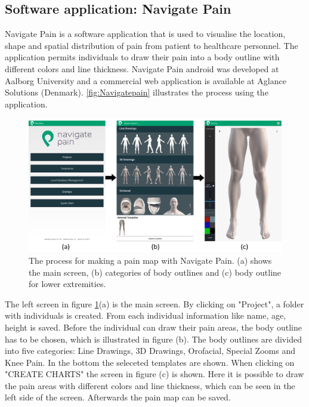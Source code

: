 \subsection{Software application: Navigate Pain} \label{sec:nav}
Navigate Pain is a software application that is used to visualise the location, shape and spatial distribution of pain from patient to healthcare personnel. The application permits individuals to draw their pain into a body outline with different colors and line thickness. Navigate Pain android was developed at Aalborg University and a commercial web application is available at Aglance Solutions (Denmark).\citep{Solutions2015}
\autoref{fig:Navigatepain} illustrates the process using the application.

\begin{figure} [H]
\centering
\includegraphics[width=1\textwidth]{figures/Navigatepain}
\caption{The process for making a pain map with Navigate Pain. (a) shows the main screen, (b) categories of body outlines and (c) body outline for lower extremities.}
\label{fig:Navigatepain}
\end{figure}

\noindent
The left screen in figure \ref{fig:Navigatepain}(a) is the main screen. By clicking on "Project", a folder with individuals is created. From each individual information like name, age, height is saved. Before the individual can draw their pain areas, the body outline has to be chosen, which is illustrated in figure (b). The body outlines are divided into five categories: Line Drawings, 3D Drawings, Orofacial, Special Zooms and Knee Pain. In the bottom the seleceted templates are shown. When clicking on "CREATE CHARTS" the screen in figure (c) is shown. Here it is possible to draw the pain areas with different colors and line thickness, which can be seen in the left side of the screen. Afterwards the pain map can be saved. 


